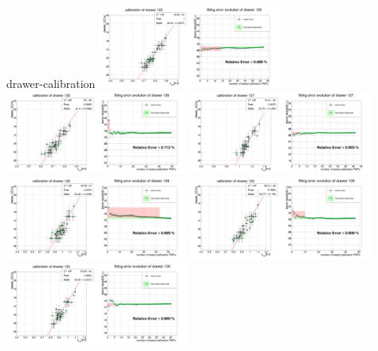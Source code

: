 \documentclass[11pt,compress,xcolor=x11names,UTF8]{beamer}
\begin{document}
\begin{frame}{drawer-calibration}
\vspace{-.5cm}
\includegraphics[width=0.45\textwidth]{sta101-24} 
\includegraphics[width=0.45\textwidth]{sta101-25} 
\includegraphics[width=0.45\textwidth]{sta101-26} 
\includegraphics[width=0.45\textwidth]{sta101-27} 
\includegraphics[width=0.45\textwidth]{sta101-28} 
\includegraphics[width=0.45\textwidth]{sta101-29} 
\end{frame}
\end{document}
